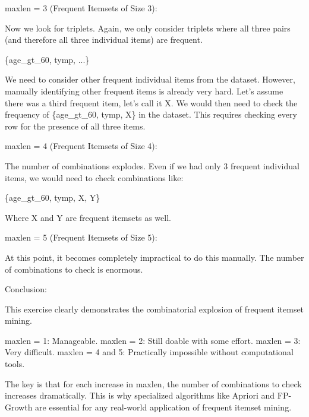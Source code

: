 \documentclass[12pt]{article}
\begin{document}
\begin{mdframed}

maxlen = 3 (Frequent Itemsets of Size 3):
\newline

Now we look for triplets. Again, we only consider triplets where all three pairs (and therefore all three individual items) are frequent.
\newline

    \{age\_gt\_60, tymp, ...\}
\newline

We need to consider other frequent individual items from the dataset. However, manually identifying other frequent items is already very hard. Let's assume there was a third frequent item, let's call it X. We would then need to check the frequency of \{age\_gt\_60, tymp, X\} in the dataset. This requires checking every row for the presence of all three items.
\newline

maxlen = 4 (Frequent Itemsets of Size 4):
\newline

The number of combinations explodes. Even if we had only 3 frequent individual items, we would need to check combinations like:
\newline

    \{age\_gt\_60, tymp, X, Y\}
\newline

Where X and Y are frequent itemsets as well.
\newline

maxlen = 5 (Frequent Itemsets of Size 5):
\newline

At this point, it becomes completely impractical to do this manually. The number of combinations to check is enormous.
\newline

Conclusion:
\newline

This exercise clearly demonstrates the combinatorial explosion of frequent itemset mining.
\newline

    maxlen = 1: Manageable.
    maxlen = 2: Still doable with some effort.
    maxlen = 3: Very difficult.
    maxlen = 4 and 5: Practically impossible without computational tools.
\newline

The key is that for each increase in maxlen, the number of combinations to check increases dramatically. This is why specialized algorithms like Apriori and FP-Growth are essential for any real-world application of frequent itemset mining.
\end{mdframed}
\end{document}
